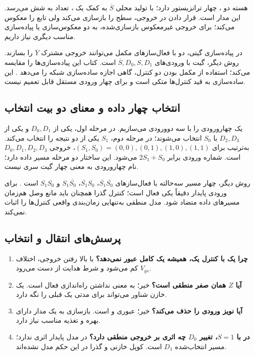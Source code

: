 هسته  دو ، چهار ترانزیستور دارد؛ با تولید محلی
\(\overline{S}\) به کمک یک ، تعداد به شش می‌رسد.
این مدار  است. قرار دادن  در خروجی،
سطح را بازسازی می‌کند ولی تابع را معکوس می‌کند؛ برای خروجی غیرمعکوس بازسازی‌شده،
به دو معکوس‌سازی یا پیاده‌سازی مناسب دیگری نیاز داریم.

در پیاده‌سازی گیتی، دو  با فعال‌سازهای مکمل
می‌توانند خروجی مشترک \(\overline{Y}\) را بسازند.
روش دیگر، گیت  با ورودی‌های \(\overline{S},D_0,S,D_1\) است.
کتاب این پیاده‌سازی‌ها را مقایسه می‌کند؛ استفاده از مکمل بودن دو کنترل،
گاهی اجازه ساده‌سازی شبکه را می‌دهد \cite[شکل ]{weste}.
این ساده‌سازی به قید کنترل‌ها متکی است و برای چهار ورودی مستقل قابل تعمیم نیست.

\subsection{انتخاب چهار داده و معنای دو بیت انتخاب}
یک  چهارورودی را با سه  دوورودی می‌سازیم.
در مرحله اول، یکی از \(D_0,D_1\) و یکی از \(D_2,D_3\) با \(S_0\)
انتخاب می‌شوند؛ در مرحله دوم، \(S_1\) یکی از دو نتیجه را انتخاب می‌کند.
به‌ترتیب برای \((S_1,S_0)=(0,0),(0,1),(1,0),(1,1)\)،
خروجی \(D_0,D_1,D_2,D_3\) است. شماره ورودی برابر \(2S_1+S_0\) می‌شود.
این ساختار دو مرحله مسیر داده دارد؛ نام چهارورودی به معنی چهار گیت سری نیست.

روش دیگر، چهار مسیر سه‌حالته با فعال‌سازهای
\(\overline{S_1}\overline{S_0}\)، \(\overline{S_1}S_0\)،
\(S_1\overline{S_0}\) و \(S_1S_0\) است
\cite[شکل ]{weste}.
برای ورودی پایدار دقیقاً یکی فعال است؛ کنترل گذرا همچنان باید مانع وصل هم‌زمان
مسیرهای داده متضاد شود. مدل منطقی به‌تنهایی زمان‌بندی واقعی کنترل‌ها را اثبات نمی‌کند.

\subsection{پرسش‌های انتقال و انتخاب}
\begin{enumerate}
\item \textbf{چرا یک  با کنترل یک، همیشه یک کامل عبور نمی‌دهد؟}
با بالا رفتن خروجی، اختلاف \(V_{gs}\) کم می‌شود و شرط هدایت از دست می‌رود.
\item \textbf{آیا \(Z\) همان صفر منطقی است؟}
خیر؛ به معنی نداشتن راه‌اندازی فعال است. یک خازن شناور می‌تواند برای مدتی یک قبلی را نگه دارد.
\item \textbf{آیا  نویز ورودی را حذف می‌کند؟}
خیر؛ عبوری و  است. بازسازی به یک مدار دارای بهره و تغذیه مناسب نیاز دارد.
\item \textbf{در  با \(S=1\)، تغییر \(D_0\) چه اثری بر خروجی منطقی دارد؟}
در مدل پایدار اثری ندارد؛ مسیر انتخاب‌شده \(D_1\) است. کوپل خازنی و گذرا در این حکم مدل نشده‌اند.
\end{enumerate}
